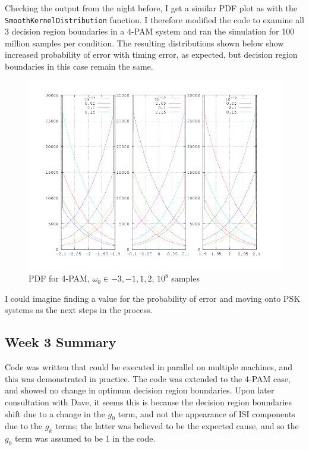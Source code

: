 Checking the output from the night before, I get a similar PDF plot as
with the \texttt{SmoothKernelDistribution} function. I therefore
modified the code to examine all 3 decision region boundaries in a 4-PAM
system and ran the simulation for 100 million samples per condition. The
resulting distributions shown below show increased probability of error
with timing error, as expected, but decision region boundaries in this
case remain the same.

\begin{figure}[htbp]
\centering
\includegraphics[width=\linewidth]{../../../plots/4pamdecision.png}
\caption{PDF for 4-PAM, $\omega_0 \in {-3,-1,1,2}$, $10^8$ samples}
\end{figure}

I could imagine finding a value for the probability of error and moving
onto PSK systems as the next steps in the process.

\subsection{Week 3 Summary}

Code was written that could be executed in parallel on multiple
machines, and this was demonstrated in practice. The code was extended
to the 4-PAM case, and showed no change in optimum decision region
boundaries. Upon later consultation with Dave, it seems this is because
the decision region boundaries shift due to a change in the $g_0$ term,
and not the appearance of ISI components due to the $g_k$ terms; the
latter was believed to be the expected cause, and so the $g_0$ term was
assumed to be 1 in the code.

